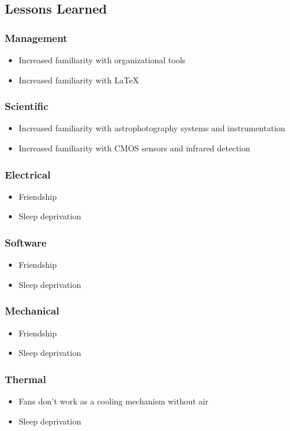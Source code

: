 \pagebreak
\subsection{Lessons Learned}

\subsubsection{Management}

\begin{itemize}
    \item Increased familiarity with organizational tools
    \item Increased familiarity with LaTeX
\end{itemize}


\subsubsection{Scientific}

\begin{itemize}
    \item Increased familiarity with astrophotography systems and instrumentation
    \item Increased familiarity with CMOS sensors and infrared detection 
\end{itemize}


\subsubsection{Electrical}
 
\begin{itemize}
    \item Friendship
    \item Sleep deprivation
\end{itemize}


\subsubsection{Software }

\begin{itemize}
    \item Friendship
    \item Sleep deprivation
\end{itemize}


\subsubsection{Mechanical }

\begin{itemize}
    \item Friendship
    \item Sleep deprivation
\end{itemize}


\subsubsection{Thermal }
\begin{itemize}
    \item Fans don't work as a cooling mechanism without air
    \item Sleep deprivation
\end{itemize}
